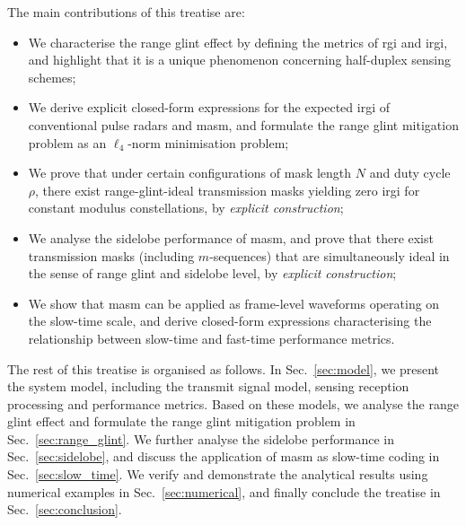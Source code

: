 \documentclass[journal,a4paper,10pt, romanappendices]{IEEEtran}
\begin{document}
The main contributions of this treatise are:
\begin{itemize}
    \item We characterise the range glint effect by defining the metrics of \acf{rgi} and \acf{irgi}, and highlight that it is a unique phenomenon concerning half-duplex sensing schemes;
    \item We derive explicit closed-form expressions for the expected \ac{irgi} of conventional pulse radars and \ac{masm}, and formulate the range glint mitigation problem as an $\ell_4$-norm minimisation problem;
    \item We prove that under certain configurations of mask length $N$ and duty cycle $\rho$, there exist range-glint-ideal transmission masks yielding zero \ac{irgi} for constant modulus constellations, by \emph{explicit construction};
    \item We analyse the sidelobe performance of \ac{masm}, and prove that there exist transmission masks (including $m$-sequences) that are simultaneously ideal in the sense of range glint and sidelobe level, by \emph{explicit construction};
    \item We show that \ac{masm} can be applied as frame-level waveforms operating on the slow-time scale, and derive closed-form expressions characterising the relationship between slow-time and fast-time performance metrics.
\end{itemize}

The rest of this treatise is organised as follows. In Sec.~\ref{sec:model}, we present the system model, including the transmit signal model, sensing reception processing and performance metrics. Based on these models, we analyse the range glint effect and formulate the range glint mitigation problem in Sec.~\ref{sec:range_glint}. We further analyse the sidelobe performance in Sec.~\ref{sec:sidelobe}, and discuss the application of \ac{masm} as slow-time coding in Sec.~\ref{sec:slow_time}. We verify and demonstrate the analytical results using numerical examples in Sec.~\ref{sec:numerical}, and finally conclude the treatise in Sec.~\ref{sec:conclusion}. 
\end{document}
